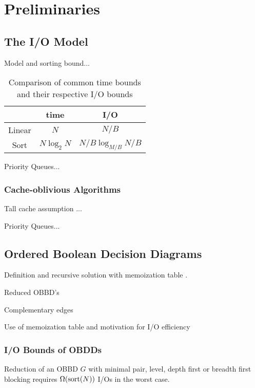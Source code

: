\section{Preliminaries} \label{sec:preliminaries}

\subsection{The I/O Model}
Model and sorting bound... \cite{Aggarwal87}

\begin{table}[ht!]
  \centering
  
  \begin{tabular}{c|c|c}
           & time         & I/O
    \\ \hline
    Linear & $N$          & $N/B$
    \\
    Sort   & $N \log_2 N$ & $N/B \log_{M/B} N/B$
  \end{tabular}
  
  \caption{Comparison of common time bounds and their respective I/O bounds}
  \label{tab:time_vs_io}
\end{table}

Priority Queues... \cite{Arge04}

\subsubsection{Cache-oblivious Algorithms}
Tall cache assumption ...

Priority Queues... \cite{Arge07, Sanders2001}

\subsection{Ordered Boolean Decision Diagrams}
Definition and recursive solution with memoization table \cite{Bryant86,
  Brace90, Dijk16}.

Reduced OBBD's \cite[Definition2]{Bryant86}

Complementary edges \cite{Brace90}

Use of memoization table and motivation for I/O efficiency \todocite


\subsubsection{I/O Bounds of OBDDs}
\begin{theorem} \label{thm:reduce_io_lower_bound}

  Reduction of an OBBD $G$ with minimal pair, level, depth first or breadth
  first blocking requires $\Omega(\text{sort}(N))$ I/Os in the worst case.
\end{theorem}

